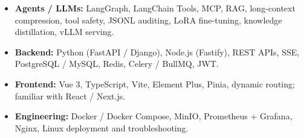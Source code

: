 \documentclass{resume}
\begin{document}
\begin{itemize}
  \item \textbf{Agents / LLMs:} LangGraph, LangChain Tools, MCP, RAG, long-context compression, tool safety, JSONL auditing, LoRA fine-tuning, knowledge distillation, vLLM serving.
  \item \textbf{Backend:} Python (FastAPI / Django), Node.js (Fastify), REST APIs, SSE, PostgreSQL / MySQL, Redis, Celery / BullMQ, JWT.
  \item \textbf{Frontend:} Vue 3, TypeScript, Vite, Element Plus, Pinia, dynamic routing; familiar with React / Next.js.
  \item \textbf{Engineering:} Docker / Docker Compose, MinIO, Prometheus + Grafana, Nginx, Linux deployment and troubleshooting.
\end{itemize}
\end{document}
